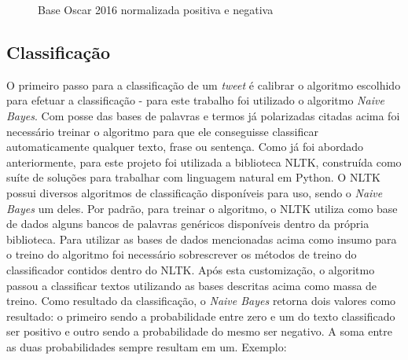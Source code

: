 \begin{figure}[h]
	
	\center
	\qquad
	\caption{Base Oscar 2016 normalizada positiva e negativa}
	
\end{figure}

\subsection{Classificação}
O primeiro passo para a classificação de um \textit{tweet} é calibrar o algoritmo escolhido para efetuar a classificação - para este trabalho foi utilizado o algoritmo \textit{Naive Bayes}. Com posse das bases de palavras e termos já polarizadas citadas acima foi necessário treinar o algoritmo para que ele conseguisse classificar automaticamente qualquer texto, frase ou sentença. 
Como já foi abordado anteriormente, para este projeto foi utilizada a biblioteca NLTK, construída como suíte de soluções para trabalhar com linguagem natural em Python. O NLTK possui diversos algoritmos de classificação disponíveis para uso, sendo o \textit{Naive Bayes} um deles. 
Por padrão, para treinar o algoritmo, o NLTK utiliza como base de dados alguns bancos de palavras genéricos disponíveis dentro da própria biblioteca. Para utilizar as bases de dados mencionadas acima como insumo para o treino do algoritmo foi necessário sobrescrever os métodos de treino do classificador contidos dentro do NLTK. Após esta customização, o algoritmo passou a classificar textos utilizando as bases descritas acima como massa de treino.
Como resultado da classificação, o \textit{Naive Bayes} retorna dois valores como resultado: o primeiro sendo a probabilidade entre zero e um do texto classificado ser positivo e outro sendo a probabilidade do mesmo ser negativo. A soma entre as duas probabilidades sempre resultam em um. Exemplo:

